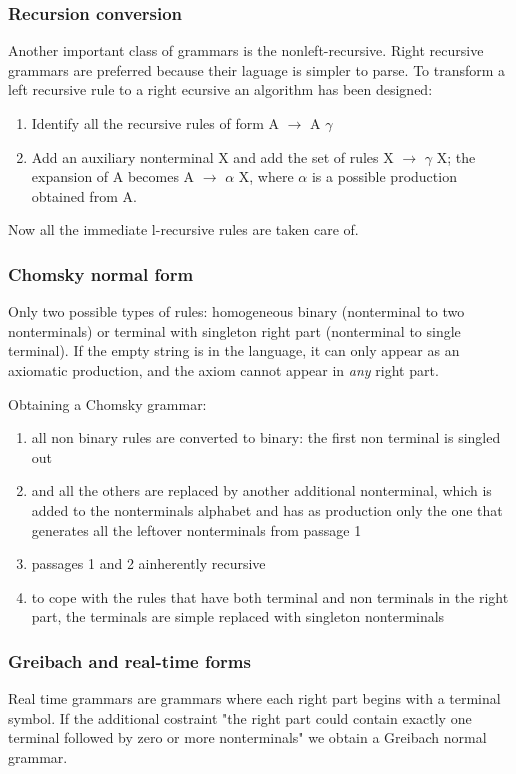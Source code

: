 		\subsubsection{Recursion conversion}
			Another important class of grammars is the nonleft-recursive. Right recursive grammars are preferred because their laguage is simpler to parse. To 
			transform a left recursive rule to a right ecursive an algorithm has been designed:
			\begin{enumerate}
				\item Identify all the recursive rules of form A $\rightarrow$ A $\gamma$
				\item Add an auxiliary nonterminal X and add the set of rules X $\rightarrow$ $\gamma$ X; the expansion of A becomes A $\rightarrow$ $\alpha$ X, 
				where $\alpha$ is a possible production obtained from A.
			\end{enumerate}
			Now all the immediate l-recursive rules are taken care of.
		\subsubsection{Chomsky normal form}
			Only two possible types of rules: homogeneous binary (nonterminal to two nonterminals) or terminal with singleton right part (nonterminal to single 
			terminal). If the empty string is in the language, it can only appear as an axiomatic production, and the axiom cannot appear in \emph{any} right part.

			Obtaining a Chomsky grammar:
			\begin{enumerate}
				\item all non binary rules are converted to binary: the first non terminal is singled out 
				\item and all the others are replaced by another additional nonterminal, which is added to the nonterminals alphabet and has as production only 
				the one that generates all the leftover nonterminals from passage 1
				\item passages 1 and 2 ainherently recursive
				\item to cope with the rules that have both terminal and non terminals in the right part, the terminals are simple replaced with singleton 
				nonterminals
			\end{enumerate}
		\subsubsection{Greibach and real-time forms}
			Real time grammars are grammars where each right part begins with a terminal symbol. If the additional costraint "the right part could contain exactly 
			one terminal followed by zero or more nonterminals" we obtain a Greibach normal grammar.
			 
